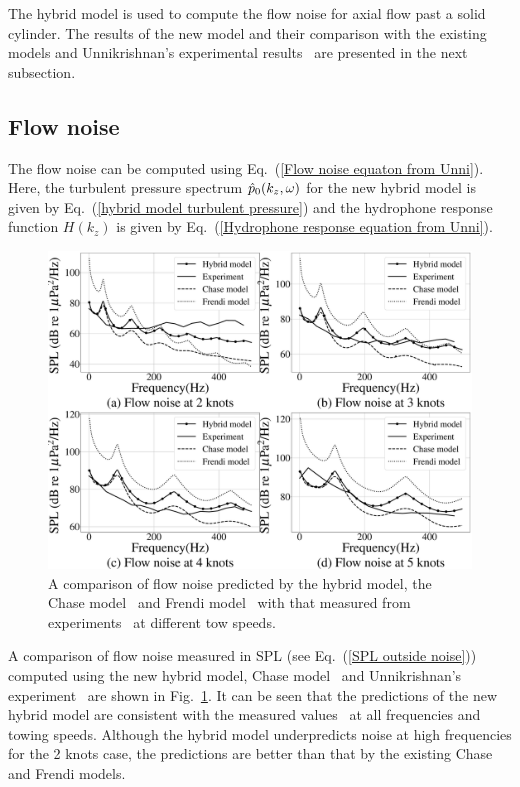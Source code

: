 \documentclass[11pt,cleanfoot]{asme2ej}
\begin{document}
The hybrid model is used to compute the flow noise for axial flow past a solid cylinder. The results of the new model and their comparison with the existing models and Unnikrishnan's experimental results~\cite{Unni2011} are presented in the next subsection.

\subsection{Flow noise}
The flow noise can be computed using Eq.~(\ref{Flow noise equaton from Unni}). Here, the turbulent pressure spectrum $\Hat{p}_0(k_z,\omega)$ for the new hybrid model is given by Eq.~(\ref{hybrid model turbulent pressure}) and the hydrophone response function $H(k_z)$ is given by Eq.~(\ref{Hydrophone response equation from Unni}).
\begin{figure}[ht]
    \centerline{\includegraphics[width=4.5in]{Hybrid_model_Chase_frendi_vs_Unni_comparison.eps}}
    \caption{A comparison of flow noise predicted by the hybrid model, the Chase model~\cite{Chase1981} and Frendi model~\cite{frendi2020} with that measured from experiments~\cite{Unni2011} at different tow speeds.}
\label{fig:Flow_noise_of_Hybrid_model_with_chase_frendi_and_Unnikrishnan}
\end{figure}
A comparison of flow noise measured in SPL (see Eq.~(\ref{SPL outside noise})) computed using the new hybrid model, Chase model~\cite{Chase1981} and Unnikrishnan's experiment~\cite{Unni2011} are shown in Fig.~\ref{fig:Flow_noise_of_Hybrid_model_with_chase_frendi_and_Unnikrishnan}. It can be seen that the predictions of the new hybrid model are consistent with the measured values~\cite{Unni2011} at all frequencies and towing speeds. Although the hybrid model underpredicts noise at high frequencies for the 2 knots case, the predictions are better than that by the existing Chase and Frendi models.
\end{document}
